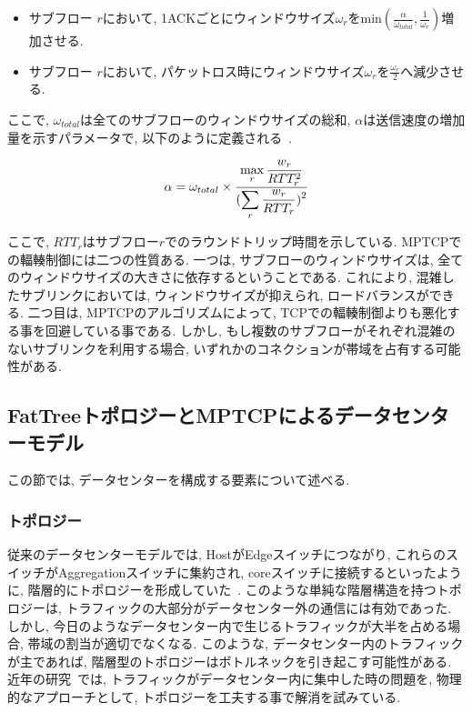 \documentclass[10pt, a4paper, twocolumn]{jsarticle}
\begin{document}
\begin{itemize}
\item サブフロー $r$において,
1ACKごとにウィンドウサイズ$\omega_{r}$をmin$(\frac{\alpha}{\omega_{total}},
\frac{1}{\omega_r})$増加させる.
\item サブフロー $r$において, パケットロス時にウィンドウサイズ$\omega_r$を$\frac{\omega_r}{2}$へ減少させる.
\end{itemize}
ここで, $\omega_{total}$は全てのサブフローのウィンドウサイズの総和, $\alpha$は送信速度の増加量を示すパラメータで,
以下のように定義される~\cite{cong}.

\vspace{-2mm}
\begin{eqnarray}
 \alpha = \omega_{total} \times
\frac{\displaystyle \max_{r} \frac{w_r}{RTT^2_r}}{\displaystyle
(\sum_{r}\frac{w_r}{RTT_r})^2}
\label{alpha}
\vspace{-2mm}
\end{eqnarray}

ここで, $RTT_r$はサブフロー$r$でのラウンドトリップ時間を示している.
MPTCPでの輻輳制御には二つの性質ある.
一つは, サブフローのウィンドウサイズは, 全てのウィンドウサイズの大きさに依存するということである.
これにより, 混雑したサブリンクにおいては, ウィンドウサイズが抑えられ, ロードバランスができる.
二つ目は, MPTCPのアルゴリズムによって, TCPでの輻輳制御よりも悪化する事を回避している事である.
しかし, もし複数のサブフローがそれぞれ混雑のないサブリンクを利用する場合, いずれかのコネクションが帯域を占有する可能性がある.

\subsection{FatTreeトポロジーとMPTCPによるデータセンターモデル}
\label{sec:fattree}
この節では, データセンターを構成する要素について述べる.
\subsubsection{トポロジー}
\label{subsec:topology}
従来のデータセンターモデルでは, HostがEdgeスイッチにつながり,
これらのスイッチがAggregationスイッチに集約され,
coreスイッチに接続するといったように, 階層的にトポロジーを形成していた~\cite{fattree}.
このような単純な階層構造を持つトポロジーは, トラフィックの大部分がデータセンター外の通信には有効であった.
しかし, 今日のようなデータセンター内で生じるトラフィックが大半を占める場合, 帯域の割当が適切でなくなる.
このような, データセンター内のトラフィックが主であれば, 階層型のトポロジーはボトルネックを引き起こす可能性がある.
近年の研究~\cite{fattree,bcube,vl2}では, トラフィックがデータセンター内に集中した時の問題を, 物理的なアプローチとして,
トポロジーを工夫する事で解消を試みている.
\end{document}
